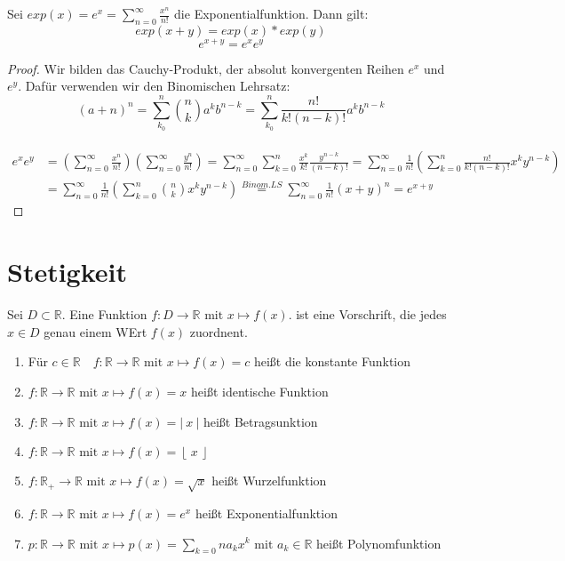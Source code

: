 \documentclass[a4paper,titlepage,oneside]{article}
\def\R{\ensuremath{\mathbb{R}} }
\def\e{\ensuremath{\mathit{e}} }
\newcommand{\suminf}[2][n]{\ensuremath{\sum_{#1= 0}^{\infty}{#2}}}
\newcommand{\abs}[1]{\ensuremath{\left|\:#1\:\right|}}
\newcommand{\floor}[1]{\ensuremath{\left\lfloor\:#1\:\right\rfloor}}
\theoremstyle{thmstyle}
\begin{document}
\begin{subkorr}
Sei \(exp(x) = \e^x = \suminf{\frac{x^n}{n!}}\) die Exponentialfunktion. Dann gilt:
\[exp(x+y) = exp(x) * exp(y)\]
\[e^{x+y} = e^x e^y\]
\begin{proof}
Wir bilden das Cauchy-Produkt, der absolut konvergenten Reihen $e^x$ und $ e^y$. Dafür verwenden wir den Binomischen Lehrsatz:
\[(a+n)^n = \sum_{k_0}^{n}{\binom{n}{k}a^kb^{n-k}} = \sum_{k_0}^{n}{\frac{n!}{k!(n-k)!}a^kb^{n-k}}\] \\
\[\begin{aligned}
e^x e^y &= \left(\suminf{\frac{x^n}{n!}}\right)\left(\suminf{\frac{y^n}{n!}}\right)
= \suminf{\sum_{k = 0}^{n}{\frac{x^k}{k!}\frac{y^{n-k}}{(n-k)!}}}
= \suminf{\frac{1}{n!}\left(\sum_{k = 0}^{n}{\frac{n!}{k!(n-k)!}x^ky^{n-k}}\right)} \\
&= \suminf{\frac{1}{n!}\left(\sum_{k = 0}^{n}{\binom{n}{k}x^ky^{n-k}}\right)}
\overset{Binom.LS}{=} \suminf{\frac{1}{n!}(x+y)^n} = e^{x+y}
\end{aligned}\]
\end{proof}
\end{subkorr}


\newpage
\section{Stetigkeit}
\begin{defi}
Sei $ D \subset \R$. Eine Funktion $f : D \to \R \text{ mit } x \mapsto f(x) $. ist eine Vorschrift, die jedes $ x \in D$ genau einem WErt $f(x)$ zuordnent.
\end{defi}

\begin{bsp}
\begin{enumerate}
\item Für $ c \in \R \quad f : \R \to \R \text{ mit } x \mapsto f(x) = c $ heißt die konstante Funktion %
\item $f : \R \to \R \text{ mit } x \mapsto f(x) = x $ heißt identische Funktion %
\item $f : \R \to \R \text{ mit } x \mapsto f(x) = \abs{x} $ heißt Betragsunktion %
\item $f : \R \to \R \text{ mit } x \mapsto f(x) = \floor{x} $ %
\item $f : \R_+ \to \R \text{ mit } x \mapsto f(x) = \sqrt{x} $ heißt Wurzelfunktion %
\item $f : \R \to \R \text{ mit } x \mapsto f(x) = e^x $ heißt Exponentialfunktion %
\item $p : \R \to \R \text{ mit } x \mapsto p(x) = \sum_{k=0}{n}{a_kx^k} \text{ mit } a_k \in \R $ heißt Polynomfunktion %
\end{enumerate}
\end{bsp}
\end{document}
